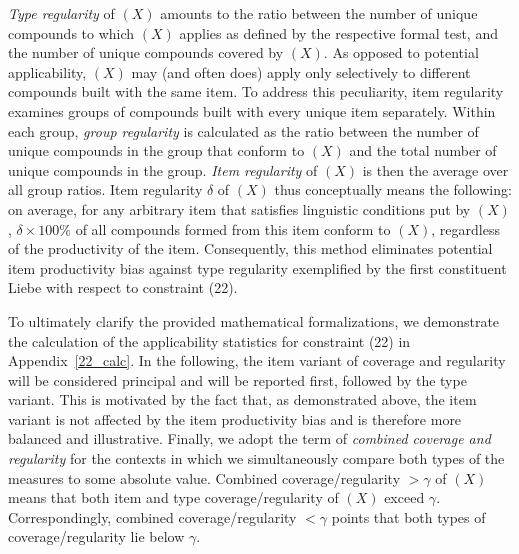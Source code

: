 \documentclass[10pt, a4paper]{article}
\begin{document}
\textit{Type regularity} of $(X)$ amounts to the ratio between the number of unique compounds to which $(X)$ applies as defined by the respective formal test, and the number of unique compounds covered by $(X)$. As opposed to potential applicability, $(X)$ may (and often does) apply only selectively to different compounds built with the same item. To address this peculiarity, item regularity examines groups of compounds built with every unique item separately. Within each group, \textit{group regularity} is calculated as the ratio between the number of unique compounds in the group that conform to $(X)$ and the total number of unique compounds in the group. \textit{Item regularity} of $(X)$ is then the average over all group ratios. Item regularity $\delta$ of $(X)$ thus conceptually means the following: on average, for any arbitrary item that satisfies linguistic conditions put by $(X)$, $\delta \times 100\%$ of all compounds formed from this item conform to $(X)$, regardless of the productivity of the item. Consequently, this method eliminates potential item productivity bias against type regularity exemplified by the first constituent Liebe with respect to constraint (22).

To ultimately clarify the provided mathematical formalizations, we demonstrate the calculation of the applicability statistics for constraint (22) in Appendix~\ref{22_calc}. In the following, the item variant of coverage and regularity will be considered principal and will be reported first, followed by the type variant. This is motivated by the fact that, as demonstrated above, the item variant is not affected by the item productivity bias and is therefore more balanced and illustrative. Finally, we adopt the term of \textit{combined coverage and regularity} for the contexts in which we simultaneously compare both types of the measures to some absolute value. Combined coverage/regularity $>\gamma$ of $(X)$ means that both item and type coverage/regularity of $(X)$ exceed $\gamma$. Correspondingly, combined coverage/regularity $<\gamma$ points that both types of coverage/regularity lie below $\gamma$.

\end{document}
